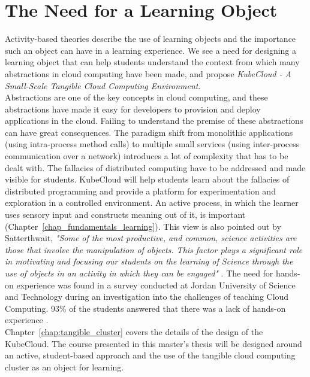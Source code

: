 \section{The Need for a Learning Object}
Activity-based theories describe the use of learning objects and the importance such an object can have in a learning experience. We see a need for designing a learning object that can help students understand the context from which many abstractions in cloud computing have been made, and propose \textit{KubeCloud - A Small-Scale Tangible Cloud Computing Environment}.\\

\noindent
Abstractions are one of the key concepts in cloud computing, and these abstractions have made it easy for developers to provision and deploy applications in the cloud. Failing to understand the premise of these abstractions can have great consequences. The paradigm shift from monolithic applications (using intra-process method calls) to multiple small services (using inter-process communication over a network) introduces a lot of complexity that has to be dealt with. The fallacies of distributed computing have to be addressed and made visible for students. KubeCloud will help students learn about the fallacies of distributed programming and provide a platform for experimentation and exploration in a controlled environment. An active process, in which the learner uses sensory input and constructs meaning out of it, is important (Chapter~\ref{chap_fundamentals_learning}). This view is also pointed out by Satterthwait, \textit{"Some of the most productive, and common, science activities are those that involve the manipulation of objects. This factor plays a significant role in motivating and focusing our students on the learning of Science through the use of objects in an activity in which they can be engaged"} \cite[p. 8]{satterthwait2010hands}. The need for hands-on experience was found in a survey conducted at Jordan University of Science and Technology during an investigation into the challenges of teaching Cloud Computing. 93\% of the students answered that there was a lack of hands-on experience \cite[p. 2]{jararweh2013teachcloud}. \\

\noindent
Chapter~\ref{chap:tangible_cluster} covers the details of the design of the KubeCloud. The course presented in this master's thesis will be designed around an active, student-based approach and the use of the tangible cloud computing cluster as an object for learning.
